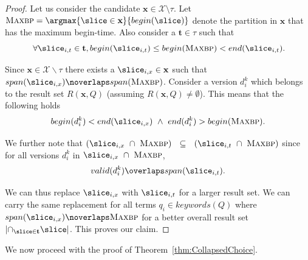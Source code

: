 \begin{proof}{} 
Let us consider the candidate $\mathbf{x} \in \mathcal{X}\setminus \tau$. Let $\textsc{Maxbp} = \argmax{\slice \in \mathbf{x}}{begin(\slice)}$ denote the partition in $\mathbf{x}$ that has the maximum begin-time. Also consider a $\mathbf{t} \in \tau$ such that $$\,\,\forall \slice_{i,t} \in \mathbf{t}, begin(\slice_{i,t}) \leq begin(\textsc{Maxbp}) < end(\slice_{i,t}).$$ 


Since $\mathbf{x} \in \mathcal{X}\backslash \tau$ there exists a $\slice_{i,x} \in \mathbf{x}$ such that $span(\slice_{i,x}) \noverlaps span(\textsc{Maxbp})$. Consider a version $d_i^k$ which belongs to the result set $R(\mathbf{x}, Q)$ (assuming $R(\mathbf{x}, Q) \neq \emptyset$). This means that the following holds
$$
  begin(d_i^k) < end(\slice_{i,x}) \,\, \wedge \,\, end(d_i^k) > begin(\textsc{Maxbp}).
$$

We further note that $\left(\slice_{i,x} \,\,\cap \,\,\textsc{Maxbp} \right)\,\,\,\,\subseteq \,\,\,\, \left(\slice_{i,t} \,\,\cap \,\,\textsc{Maxbp}\right)$ since for all versions $d_i^k$ in $\slice_{i,x} \,\,\cap \,\,\textsc{Maxbp}$, 
$$ 
  valid(d_i^k) \overlaps span(\slice_{i,t}).
$$ 

We can thus replace $\slice_{i,x}$ with $\slice_{i,t}$ for a larger result set. We can carry the same replacement for all terms $q_i \in keywords(Q)$ where $span(\slice_{i,x}) \noverlaps \textsc{Maxbp}$ for a better overall result set $\left| \cap_{\slice \in \mathbf{t}}{\mathbf{\slice}} \right|$. This proves our claim.

\end{proof}

We now proceed with the proof of Theorem~\ref{thm:CollapsedChoice}.


